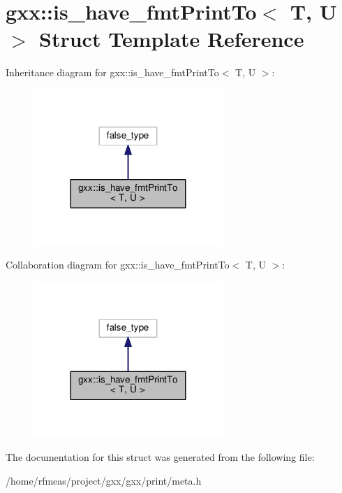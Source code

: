 \hypertarget{structgxx_1_1is__have__fmtPrintTo}{}\section{gxx\+:\+:is\+\_\+have\+\_\+fmt\+Print\+To$<$ T, U $>$ Struct Template Reference}
\label{structgxx_1_1is__have__fmtPrintTo}


Inheritance diagram for gxx\+:\+:is\+\_\+have\+\_\+fmt\+Print\+To$<$ T, U $>$\+:
\nopagebreak
\begin{figure}[H]
\begin{center}
\leavevmode
\includegraphics[width=203pt]{structgxx_1_1is__have__fmtPrintTo__inherit__graph}
\end{center}
\end{figure}


Collaboration diagram for gxx\+:\+:is\+\_\+have\+\_\+fmt\+Print\+To$<$ T, U $>$\+:
\nopagebreak
\begin{figure}[H]
\begin{center}
\leavevmode
\includegraphics[width=203pt]{structgxx_1_1is__have__fmtPrintTo__coll__graph}
\end{center}
\end{figure}


The documentation for this struct was generated from the following file\+:\begin{DoxyCompactItemize}
\item 
/home/rfmeas/project/gxx/gxx/print/meta.\+h\end{DoxyCompactItemize}
